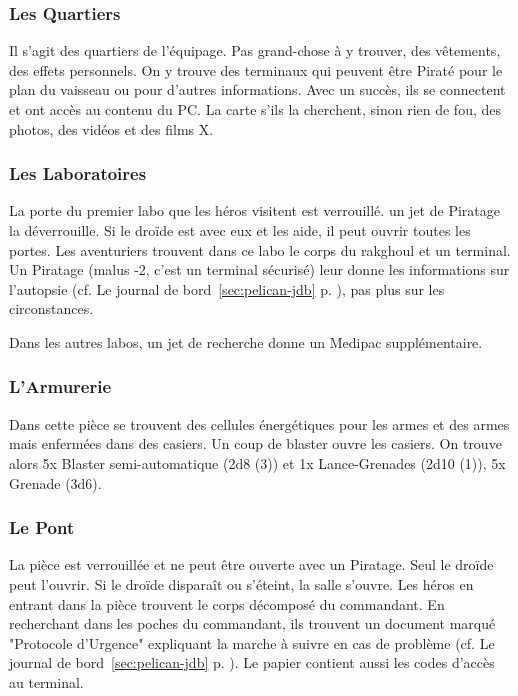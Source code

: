 \subsubsection{Les Quartiers}
Il s’agit des quartiers de l’équipage. Pas grand-chose à y trouver, des vêtements, des effets personnels. On y trouve des terminaux qui peuvent être Piraté pour le plan du vaisseau ou pour d’autres informations. Avec un succès, ils se connectent et ont accès au contenu du PC. La carte s’ils la cherchent, sinon rien de fou, des photos, des vidéos et des films X.

\subsubsection{Les Laboratoires}
La porte du premier labo que les héros visitent est verrouillé. un jet de Piratage la déverrouille. Si le droïde est avec eux et les aide, il peut ouvrir toutes les portes. Les aventuriers trouvent dans ce labo le corps du rakghoul et un terminal. Un Piratage (malus -2, c’est un terminal sécurisé) leur donne les informations sur l’autopsie (cf. Le journal de bord~\ref{sec:pelican-jdb} p. \pageref{sec:pelican-jdb}), pas plus sur les circonstances.

Dans les autres labos, un jet de recherche donne un Medipac supplémentaire.

\subsubsection{L’Armurerie}
Dans cette pièce se trouvent des cellules énergétiques pour les armes et des armes mais enfermées dans des casiers. Un coup de blaster ouvre les casiers. On trouve alors 5x Blaster semi-automatique (2d8 (3)) et 1x Lance-Grenades (2d10 (1)), 5x Grenade (3d6).

\subsubsection{Le Pont}
La pièce est verrouillée et ne peut être ouverte avec un Piratage. Seul le droïde peut l’ouvrir. Si le droïde disparaît ou s’éteint, la salle s’ouvre. Les héros en entrant dans la pièce trouvent le corps décomposé du commandant. En recherchant dans les poches du commandant, ils trouvent un document marqué "Protocole d’Urgence" expliquant la marche à suivre en cas de problème (cf. Le journal de bord~\ref{sec:pelican-jdb} p. \pageref{sec:pelican-jdb}). Le papier contient aussi les codes d’accès au terminal.

